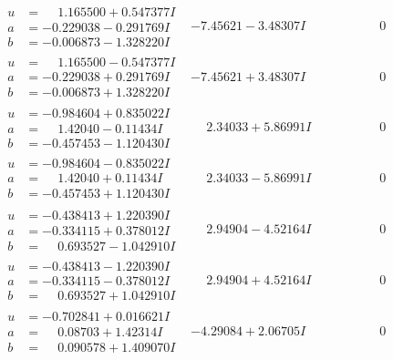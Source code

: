 \documentclass[1p]{elsarticle_modified}
\theoremstyle{definition}
\begin{document}
$$\begin{array}{c|c|c}
\begin{aligned}
u &= \phantom{-}1.165500 + 0.547377 I \\
a &= -0.229038 - 0.291769 I \\
b &= -0.006873 - 1.328220 I\end{aligned}
 & -7.45621 - 3.48307 I & \phantom{-0.000000 } 0 \\ \hline\begin{aligned}
u &= \phantom{-}1.165500 - 0.547377 I \\
a &= -0.229038 + 0.291769 I \\
b &= -0.006873 + 1.328220 I\end{aligned}
 & -7.45621 + 3.48307 I & \phantom{-0.000000 } 0 \\ \hline\begin{aligned}
u &= -0.984604 + 0.835022 I \\
a &= \phantom{-}1.42040 - 0.11434 I \\
b &= -0.457453 - 1.120430 I\end{aligned}
 & \phantom{-}2.34033 + 5.86991 I & \phantom{-0.000000 } 0 \\ \hline\begin{aligned}
u &= -0.984604 - 0.835022 I \\
a &= \phantom{-}1.42040 + 0.11434 I \\
b &= -0.457453 + 1.120430 I\end{aligned}
 & \phantom{-}2.34033 - 5.86991 I & \phantom{-0.000000 } 0 \\ \hline\begin{aligned}
u &= -0.438413 + 1.220390 I \\
a &= -0.334115 + 0.378012 I \\
b &= \phantom{-}0.693527 - 1.042910 I\end{aligned}
 & \phantom{-}2.94904 - 4.52164 I & \phantom{-0.000000 } 0 \\ \hline\begin{aligned}
u &= -0.438413 - 1.220390 I \\
a &= -0.334115 - 0.378012 I \\
b &= \phantom{-}0.693527 + 1.042910 I\end{aligned}
 & \phantom{-}2.94904 + 4.52164 I & \phantom{-0.000000 } 0 \\ \hline\begin{aligned}
u &= -0.702841 + 0.016621 I \\
a &= \phantom{-}0.08703 + 1.42314 I \\
b &= \phantom{-}0.090578 + 1.409070 I\end{aligned}
 & -4.29084 + 2.06705 I & \phantom{-0.000000 } 0 \\ \hline\begin{aligned}

\end{aligned}
\end{array}$$
\end{document}
